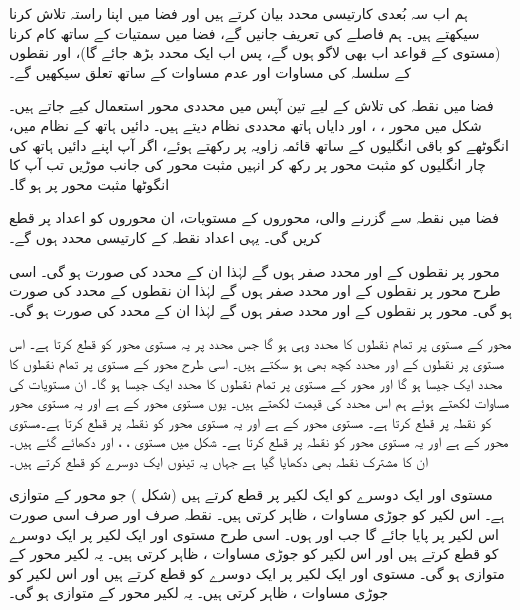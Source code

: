 ہم اب سہ بُعدی کارتیسی محدد بیان کرتے ہیں اور فضا میں اپنا راستہ تلاش کرنا سیکھتے ہیں۔ ہم فاصلے  کی تعریف جانیں گے،  فضا میں سمتیات کے ساتھ کام کرنا (مستوی کے قواعد اب بھی لاگو ہوں گے، پس اب ایک محدد بڑھ جائے گا)، اور نقطوں کے سلسلہ کی مساوات اور عدم مساوات کے ساتھ تعلق سیکھیں گے۔

فضا میں نقطہ کی تلاش کے لیے تین آپس میں   محددی محور استعمال کیے جاتے ہیں۔  شکل  میں محور ،  ، اور  دایاں ہاتھ محددی نظام دیتے ہیں۔ دائیں ہاتھ کے نظام میں، انگوٹھے کو باقی انگلیوں کے ساتھ  قائمہ  زاویہ پر رکھتے ہوئے، اگر آپ اپنے دائیں ہاتھ کی چار انگلیوں کو مثبت محور  پر رکھ کر انہیں مثبت محور  کی جانب موڑیں تب آپ کا انگوٹھا مثبت محور  پر ہو گا۔

فضا میں نقطہ  سے گزرنے والی، محوروں کے  مستویات،  ان محوروں کو اعداد   پر قطع کریں گی۔ یہی اعداد نقطہ  کے کارتیسی محدد ہوں گے۔  

محور  پر نقطوں کے  اور  محدد صفر ہوں گے لہٰذا ان کے محدد کی صورت  ہو گی۔ اسی طرح محور  پر نقطوں کے  اور  محدد صفر ہوں گے لہٰذا ان نقطوں کے محدد کی صورت  ہو گی۔ محور  پر نقطوں کے  اور  محدد صفر ہوں گے لہٰذا ان کے محدد  کی صورت  ہو گی۔

محور  کے    مستوی پر تمام نقطوں کا  محدد وہی ہو گا جس  محدد  پر یہ مستوی محور  کو قطع کرتا ہے۔ اس مستوی پر نقطوں کے  اور  محدد کچھ بھی ہو سکتے ہیں۔ اسی طرح محور   کے    مستوی پر تمام نقطوں کا   محدد ایک جیسا  ہو گا اور  محور  کے  مستوی پر تمام نقطوں کا  محدد ایک جیسا  ہو گا۔ ان مستویات کی مساوات لکھتے ہوئے ہم اس محدد کی قیمت لکھتے ہیں۔ یوں  مستوی  محور   کے    ہے اور یہ مستوی محور  کو نقطہ  پر قطع کرتا ہے۔ مستوی  محور    کے  ہے اور  یہ مستوی محور    کو نقطہ  پر قطع کرتا ہے۔مستوی  محور    کے  ہے اور  یہ مستوی  محور  کو نقطہ  پر قطع کرتا ہے۔ شکل  میں مستوی ،  ، اور  دکھائے گئے ہیں۔ ان کا مشترک نقطہ بھی دکھایا گیا ہے جہاں یہ تینوں ایک دوسرے کو قطع کرتے ہیں۔

مستوی  اور  ایک دوسرے کو ایک لکیر پر قطع کرتے ہیں (شکل ) جو محور  کے متوازی ہے۔ اس لکیر کو جوڑی مساوات ،  ظاہر کرتی  ہیں۔ نقطہ  صرف اور صرف  اسی صورت اس لکیر پر پایا جائے گا جب  اور  ہوں۔ اسی طرح مستوی  اور  ایک لکیر پر ایک دوسرے کو قطع کرتے ہیں اور اس لکیر کو جوڑی مساوات ،  ظاہر کرتی  ہیں۔ یہ لکیر محور  کے متوازی ہو گی۔ مستوی  اور  ایک لکیر پر ایک دوسرے کو قطع کرتے ہیں اور اس لکیر کو جوڑی مساوات ،  ظاہر کرتی ہیں۔ یہ لکیر محور  کے متوازی ہو گی۔


